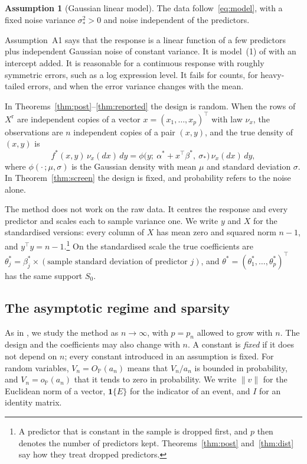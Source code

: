 \documentclass[11pt]{article}
\renewcommand{\P}{\mathbb{P}}
\newcommand{\norm}[1]{\lVert #1\rVert}
\newcommand{\ind}[1]{\mathbf{1}\{#1\}}
\newcommand{\Xr}{X^{\mathrm r}}
\newcommand{\bstar}{\beta^*}
\newcommand{\tstar}{\theta^*}
\newcommand{\sigs}{\sigma_*}
\newcommand{\Sz}{S_0}
\newcommand{\OP}{O_{\P}}
\newcommand{\oP}{o_{\P}}
\theoremstyle{plain}
\theoremstyle{definition}
\newtheorem{asm}{Assumption}
\begin{document}
\begin{asm}[Gaussian linear model]\label{a:gl}
The data follow~\eqref{eq:model}, with a fixed noise variance $\sigs^2>0$ and noise independent of the predictors.
\end{asm}

Assumption~A1 says that the response is a linear function of a few predictors plus independent Gaussian noise of
constant variance. It is model~(1) of \citet{SongLiang2015} with an intercept added. It is reasonable for a continuous
response with roughly symmetric errors, such as a log expression level. It fails for counts, for heavy-tailed errors,
and when the error variance changes with the mean.

In Theorems~\ref{thm:post}--\ref{thm:reported} the design is random. When the rows of $\Xr$ are independent copies of a
vector $x=(x_1,\dots,x_p)^\top$ with law $\nu_x$, the observations are $n$ independent copies of a pair $(x,y)$, and the
true density of $(x,y)$ is
\begin{equation}\label{eq:fstar}
  f^*(x,y)\,\nu_x(dx)\,dy=\phi\big(y;\ \alpha^*+x^\top\bstar,\ \sigs\big)\,\nu_x(dx)\,dy,
\end{equation}
where $\phi(\cdot\,;\mu,\sigma)$ is the Gaussian density with mean $\mu$ and standard deviation $\sigma$. In
Theorem~\ref{thm:screen} the design is fixed, and probability refers to the noise alone.

The method does not work on the raw data. It centres the response and every predictor and scales each to sample
variance one. We write $y$ and $X$ for the standardised versions: every column of $X$ has mean zero and squared norm
$n-1$, and $y^\top y=n-1$.\footnote{A predictor that is constant in the sample is dropped first, and $p$ then denotes
the number of predictors kept. Theorems~\ref{thm:post} and~\ref{thm:dist} say how they treat dropped predictors.} On the
standardised scale the true coefficients are $\theta^*_j=\beta^*_j\times(\text{sample standard deviation of predictor }j)$,
and $\tstar=(\theta^*_1,\dots,\theta^*_p)^\top$ has the same support $\Sz$.

\subsection{The asymptotic regime and sparsity}\label{sec:regime}

As in \citet{SongLiang2015}, we study the method as $n\to\infty$, with $p=p_n$ allowed to grow with $n$. The design and
the coefficients may also change with $n$. A constant is \emph{fixed} if it does not depend on $n$; every constant
introduced in an assumption is fixed. For random variables, $V_n=\OP(a_n)$ means that $V_n/a_n$ is bounded in
probability, and $V_n=\oP(a_n)$ that it tends to zero in probability. We write $\norm{v}$ for the Euclidean norm of a
vector, $\ind{E}$ for the indicator of an event, and $I$ for an identity matrix.
\end{document}
